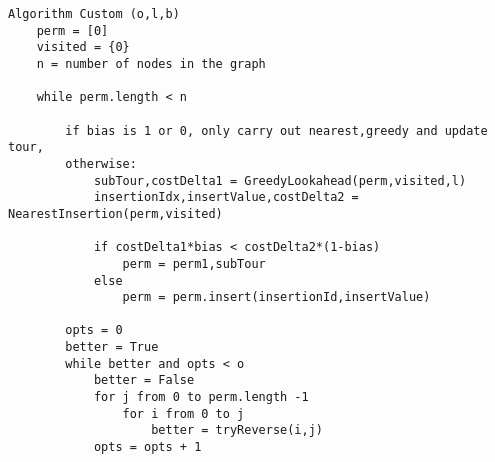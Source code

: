 \documentclass{report}
\begin{document}
\lstset{style=mystyle}

\begin{lstlisting}
Algorithm Custom (o,l,b)
    perm = [0] 
    visited = {0}
    n = number of nodes in the graph

    while perm.length < n
        
        if bias is 1 or 0, only carry out nearest,greedy and update tour,
        otherwise:
            subTour,costDelta1 = GreedyLookahead(perm,visited,l)
            insertionIdx,insertValue,costDelta2 = NearestInsertion(perm,visited)
            
            if costDelta1*bias < costDelta2*(1-bias) 
                perm = perm1,subTour
            else
                perm = perm.insert(insertionId,insertValue)

        opts = 0
        better = True
        while better and opts < o
            better = False 
            for j from 0 to perm.length -1
                for i from 0 to j
                    better = tryReverse(i,j)
            opts = opts + 1
            
\end{lstlisting}
\end{document}
